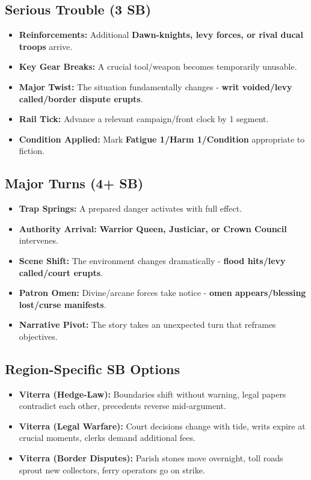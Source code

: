 \subsection*{Serious Trouble (3 SB)}
\begin{itemize}
\item \textbf{Reinforcements:} Additional \textbf{Dawn-knights, levy forces, or rival ducal troops} arrive.
\item \textbf{Key Gear Breaks:} A crucial tool/weapon becomes temporarily unusable.
\item \textbf{Major Twist:} The situation fundamentally changes - \textbf{writ voided/levy called/border dispute erupts}.
\item \textbf{Rail Tick:} Advance a relevant campaign/front clock by 1 segment.
\item \textbf{Condition Applied:} Mark \textbf{Fatigue 1/Harm 1/Condition} appropriate to fiction.
\end{itemize}

\subsection*{Major Turns (4+ SB)}
\begin{itemize}
\item \textbf{Trap Springs:} A prepared danger activates with full effect.
\item \textbf{Authority Arrival:} \textbf{Warrior Queen, Justiciar, or Crown Council} intervenes.
\item \textbf{Scene Shift:} The environment changes dramatically - \textbf{flood hits/levy called/court erupts}.
\item \textbf{Patron Omen:} Divine/arcane forces take notice - \textbf{omen appears/blessing lost/curse manifests}.
\item \textbf{Narrative Pivot:} The story takes an unexpected turn that reframes objectives.
\end{itemize}

\subsection*{Region-Specific SB Options}
\begin{itemize}
\item \textbf{Viterra (Hedge-Law):} Boundaries shift without warning, legal papers contradict each other, precedents reverse mid-argument.
\item \textbf{Viterra (Legal Warfare):} Court decisions change with tide, writs expire at crucial moments, clerks demand additional fees.
\item \textbf{Viterra (Border Disputes):} Parish stones move overnight, toll roads sprout new collectors, ferry operators go on strike.
\end{itemize}
